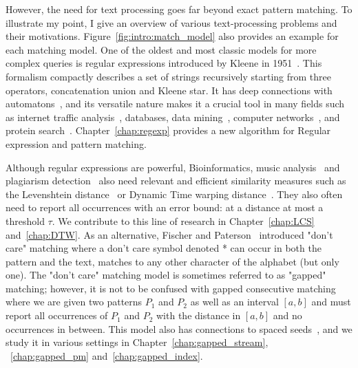 However, the need for text processing goes far beyond exact pattern matching. To illustrate my point, I give an overview of various text-processing problems and their motivations. Figure~\ref{fig:intro:match_model} also provides an example for each matching model.
One of the oldest and most classic models for more complex queries is regular expressions introduced by Kleene in 1951~\cite{RM-704}.
This formalism compactly describes a set of strings recursively starting from three operators, concatenation union and Kleene star.
It has deep connections with automatons~\cite{Thompson_automaton}, and its versatile nature makes it a crucial tool in many fields such as internet traffic analysis~\cite{4221791,4579527}, databases, data mining~\cite{1000341,10.5555/645927.672035,10.1145/375551.375569}, computer networks~\cite{10.1145/1159913.1159952}, and protein search~\cite{10.1145/369133.369220}. Chapter~\ref{chap:regexp} provides a new algorithm for Regular expression and pattern matching.

Although regular expressions are powerful, Bioinformatics\cite{Gusfield1997}, music analysis~\cite{mongeau1990comparison} and plagiarism detection~\cite{lukashenko2007computer} also need relevant and efficient similarity measures such as the Levenshtein distance~\cite{levenshtein1966binary} or Dynamic Time warping distance~\cite{sakoe1978dynamic}. They also often need to report all occurrences with an error bound\cite{landau1986efficient,landau1989fast}: at a distance at most a threshold $\tau$.
We contribute to this line of research in Chapter~\ref{chap:LCS} and~\ref{chap:DTW}.
As an alternative, Fischer and Paterson~\cite{fischer1974string} introduced "don't care" matching where a don't care symbol denoted * can occur in both the pattern and the text, matches to any other character of the alphabet (but only one).
The "don't care" matching model is sometimes referred to as "gapped" matching; however, it is not to be confused with gapped consecutive matching~\cite{bille2022gapped} where we are given two patterns $P_1$ and $P_2$ as well as an interval $[a,b]$ and must report all occurrences of $P_1$ and $P_2$ with the distance in $[a,b]$ and no occurrences in between. This model also has connections to spaced seeds~\cite{burkhardt2003better}, and we study it in various settings in Chapter~\ref{chap:gapped_stream}, ~\ref{chap:gapped_pm} and~\ref{chap:gapped_index}.

